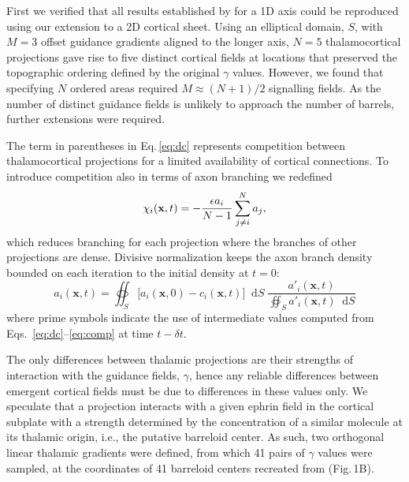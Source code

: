 \documentclass[9pt,lineno]{elife}
\newcommand*\dif{\mathop{}\!\mathrm{d}}
\begin{document}
First we verified that all results established by \cite{karbowski_model_2004}
for a 1D axis could be reproduced using our extension to a 2D cortical
sheet. Using an elliptical domain, $S$, with $M=3$ offset guidance gradients
aligned to the longer axis, $N=5$ thalamocortical projections gave rise to
five distinct cortical fields at locations that preserved the topographic
ordering defined by the original $\gamma$ values. However, we found that
specifying $N$ ordered areas required $M\approx (N+1)/2$ signalling fields. As
the number of distinct guidance fields is unlikely to approach the number of
barrels, further extensions were required.

The term in parentheses in Eq.\,\ref{eq:dc} represents competition between
thalamocortical projections for a limited availability of cortical
connections. To introduce competition also in terms of axon branching we
redefined
%
\begin{equation} \label{eq:comp}
\chi_i(\mathbf{x}, t) = - \frac{\epsilon  a_i}{N-1} \sum_{j \ne i}^{N} a_{j},
\end{equation}
%
which reduces branching for each projection where the branches of other
projections are dense. Divisive normalization keeps the axon branch density
bounded on each iteration to the initial density  at $t=0$:
%
\begin{equation} \label{eq:norm}
  a_i(\mathbf{x}, t) = \oiint_{S} \big[ a_i(\mathbf{x}, 0) - c_i(\mathbf{x}, t) \big] \dif S \; \frac {a'_i(\mathbf{x}, t)} {\oiint_{S}
  a'_i(\mathbf{x}, t) \dif S}
\end{equation}
%
where prime symbols indicate the use of intermediate values computed from
Eqs.~\ref{eq:dc}--\ref{eq:comp} at time $t-{\delta}t$. 

The only differences between thalamic projections are their strengths of
interaction with the guidance fields, $\gamma$, hence any reliable differences
between emergent cortical fields must be due to differences in these values
only. We speculate that a projection interacts with a given ephrin field in
the cortical subplate with a strength determined by the concentration of a
similar molecule at its thalamic origin, i.e., the putative barreloid
center. As such, two orthogonal linear thalamic gradients were defined, from
which 41 pairs of $\gamma$ values were sampled, at the coordinates of 41
barreloid centers recreated from \citealp{haidarliu_size_2001} (Fig.\,1B).
\end{document}
